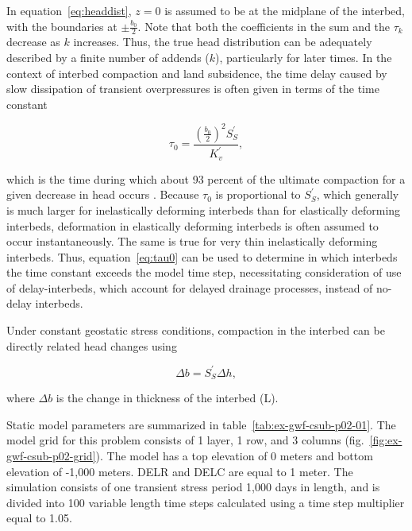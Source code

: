 In equation~\ref{eq:headdist}, $z = 0$ is assumed to be at the midplane of the interbed, with the boundaries at $\pm \frac{b_0}{2}$. Note that both the coefficients in the sum and the $\tau_k$ decrease as $k$ increases. Thus, the true head distribution can be adequately described by a finite number of addends ($k$), particularly for later times. In the context of interbed compaction and land subsidence, the time delay caused by slow dissipation of transient overpressures is often given in terms of the time constant

\begin{equation}
	\tau_0 = \frac{ \left( \frac{b_0}{2} \right)^2 S^{\prime}_{S} }{K^{\prime}_{v}},
	\label{eq:tau0}
\end{equation}

\noindent which is the time during which about 93 percent of the ultimate compaction for a given decrease in head occurs \citep{riley1969analysis}. Because $\tau_0$ is proportional to $S^{\prime}_{S} $, which generally is much larger for inelastically deforming interbeds than for elastically deforming interbeds, deformation in elastically deforming interbeds is often assumed to occur instantaneously. The same is true for very thin inelastically deforming interbeds. Thus, equation~\ref{eq:tau0} can be used to determine in which interbeds the time constant exceeds the model time step, necessitating consideration of use of delay-interbeds, which account for delayed drainage processes, instead of no-delay interbeds.

Under constant geostatic stress conditions, compaction in the interbed can be directly related head changes using

\begin{equation}
	\Delta b = S^{\prime}_{S} \Delta h,
	\label{eq:compaction}
\end{equation}

\noindent where $\Delta b$ is the change in thickness of the interbed (L).

Static model parameters are summarized in table~\ref{tab:ex-gwf-csub-p02-01}. The model grid for this problem consists of 1 layer, 1 row, and 3 columns (fig.~\ref{fig:ex-gwf-csub-p02-grid}). The model has a top elevation of 0 meters and bottom elevation of -1,000 meters.  DELR and DELC are equal to 1 meter. The simulation consists of one transient stress period 1,000 days in length, and is divided into 100 variable length time steps calculated using a time step multiplier equal to 1.05.



